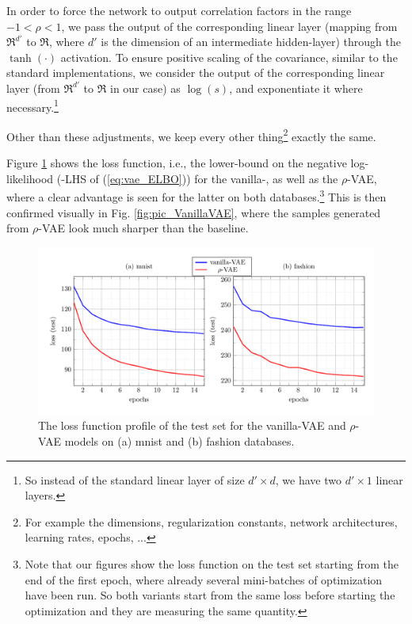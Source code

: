 \documentclass{article}
\begin{document}
In order to force the network to output correlation factors in the range $-1 < \rho < 1$, we pass the output of the corresponding linear layer (mapping from $\Re^{d'}$ to $\Re$, where $d'$ is the dimension of an intermediate hidden-layer) through the $\tanh(\cdot)$ activation. To ensure positive scaling of the covariance, similar to the standard implementations, we consider the output of the corresponding linear layer (from $\Re^{d'}$ to $\Re$ in our case) as $\log(s)$, and exponentiate it where necessary.\footnote{So instead of the standard linear layer of size $d' \times d$, we have two $d' \times 1$ linear layers.}

Other than these adjustments, we keep every other thing\footnote{For example the dimensions, regularization constants, network architectures, learning rates, epochs, ...} exactly the same. 

Figure \ref{fig:curve_VanillaVAE} shows the loss function, i.e., the lower-bound on the negative log-likelihood (-LHS of (\ref{eq:vae_ELBO})) for the vanilla-, as well as the $\rho$-VAE, where a clear advantage is seen for the latter on both databases.\footnote{Note that our figures show the loss function on the test set starting from the end of the first epoch, where already several mini-batches of optimization have been run. So both variants start from the same loss before starting the optimization and they are measuring the same quantity.} This is then confirmed visually in Fig. \ref{fig:pic_VanillaVAE}, where the samples generated from $\rho$-VAE look much sharper than the baseline. 

 \begin{figure}  [!h]
   \begin{center} 
\includegraphics[width=1.0\textwidth]{figs/curves/VanillaVAE.pdf}

\end{center}
\vspace{-.75cm}    
   \caption{The loss function profile of the test set for the vanilla-VAE and $\rho$-VAE models on (a) mnist and (b) fashion databases.}
   \label{fig:curve_VanillaVAE}
   \end{figure}
\end{document}
